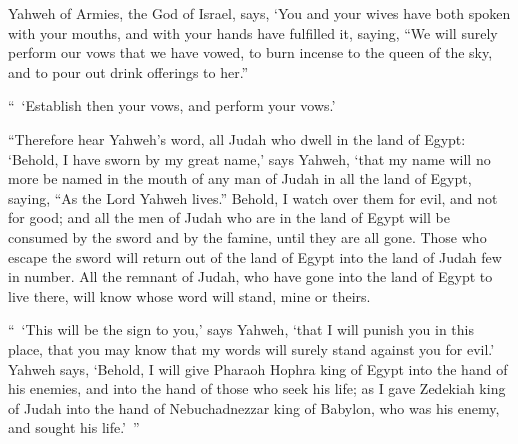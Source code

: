 {Yahweh of Armies, the God of Israel, says, ‘You and your wives have both spoken with your mouths, and with your hands have fulfilled it, saying, “We will surely perform our vows that we have vowed, to burn incense to the queen of the sky, and to pour out drink offerings to her.”
\par }{\PP “ ‘Establish then your vows, and perform your vows.’
\par }{\PP {}“Therefore hear Yahweh’s word, all Judah who dwell in the land of Egypt: ‘Behold, I have sworn by my great name,’ says Yahweh, ‘that my name will no more be named in the mouth of any man of Judah in all the land of Egypt, saying, “As the Lord Yahweh lives.”
Behold, I watch over them for evil, and not for good; and all the men of Judah who are in the land of Egypt will be consumed by the sword and by the famine, until they are all gone.
Those who escape the sword will return out of the land of Egypt into the land of Judah few in number. All the remnant of Judah, who have gone into the land of Egypt to live there, will know whose word will stand, mine or theirs.
\par }{\PP {}“ ‘This will be the sign to you,’ says Yahweh, ‘that I will punish you in this place, that you may know that my words will surely stand against you for evil.’
Yahweh says, ‘Behold, I will give Pharaoh Hophra king of Egypt into the hand of his enemies, and into the hand of those who seek his life; as I gave Zedekiah king of Judah into the hand of Nebuchadnezzar king of Babylon, who was his enemy, and sought his life.’ ”

\par }
